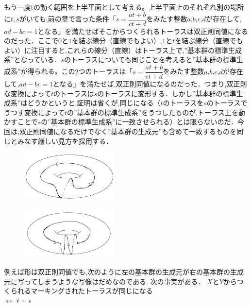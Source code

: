 もう一度tの動く範囲を上半平面として考える。上半平面上のそれぞれ別の場所に$t,s$がいても,前の章で言った条件「$s=\dfrac {at+b} {ct+d}$をみたす整数$a$,$b$,$c$,$d$が存在して,$ad-bc=1$となる」を満たせばそこからつくられるトーラスは双正則同値になるのだった．ここで$0$と$1$を結ぶ線分（直線でもよい）,$1$と$t$を結ぶ線分（直線でもよい）に注目すると,これらの線分（直線）はトーラス上で,”基本群の標準生成系”となっている．$s$のトーラスについても同じことを考えると”基本群の標準生成系”が得られる。この$2$つのトーラスは「$s=\dfrac {at+b} {ct+d}$をみたす整数$a$,$b$,$c$,$d$が存在して,$ad-bc=1$となる」を満たせば,双正則同値になるのだった．つまり,双正則な変換によって$t$のトーラスは$s$のトーラスに変形する．しかし”基本群の標準生成系”はどうかというと,証明は省くが,同じになる（$t$のトーラスを$s$のトーラスでうつす変換によって$t$の”基本群の標準生成系”をうつしたものが,トーラス上を動かすことで$s$の”基本群の標準生成系”に一致させられる）とは限らないのだ．今回は,双正則同値になるだけでなく”基本群の生成元”も含めて一致するものを同じとみなす厳しい見方を採用する．\\
\begin{figure}[h]
\begin{minipage}{0.5\hsize}
\includegraphics[width=5cm]{asaka12.png}\\
\end{minipage}
\begin{minipage}{0.5\hsize}
\includegraphics[width=5cm]{asaka14.png}\\
\end{minipage}
\end{figure}
例えば形は双正則同値でも,次のように左の基本群の生成元が右の基本群の生成元に写ってしまうような写像はだめなのである.
次の事実がある．
\thm
$X$と$Y$からつくられるマーキングされたトーラスが同じになる\\
$\Leftrightarrow $ $t=s$
\thmx
